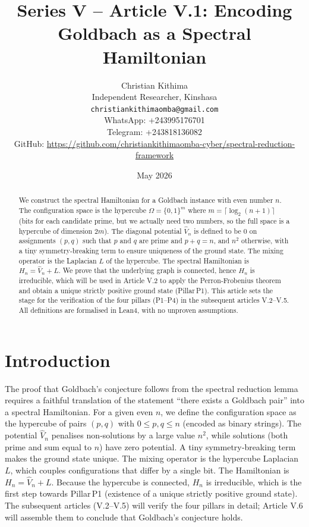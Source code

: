 \documentclass[11pt,a4paper]{article}
\title{Series V – Article V.1: Encoding Goldbach as a Spectral Hamiltonian}
\author{Christian Kithima \\
Independent Researcher, Kinshasa \\
\texttt{christiankithimaomba@gmail.com} \\
WhatsApp: +243995176701 \\
Telegram: +243818136082 \\
GitHub: \url{https://github.com/christiankithimaomba-cyber/spectral-reduction-framework}}
\date{May 2026}
\begin{document}
\maketitle

\begin{abstract}
We construct the spectral Hamiltonian for a Goldbach instance with even number \(n\). The configuration space is the hypercube \(\Omega = \{0,1\}^m\) where \(m = \lceil \log_2(n+1)\rceil\) (bits for each candidate prime, but we actually need two numbers, so the full space is a hypercube of dimension \(2m\)). The diagonal potential \(\hat{V}_n\) is defined to be \(0\) on assignments \((p,q)\) such that \(p\) and \(q\) are prime and \(p+q=n\), and \(n^2\) otherwise, with a tiny symmetry‑breaking term to ensure uniqueness of the ground state. The mixing operator is the Laplacian \(L\) of the hypercube. The spectral Hamiltonian is \(H_n = \hat{V}_n + L\). We prove that the underlying graph is connected, hence \(H_n\) is irreducible, which will be used in Article V.2 to apply the Perron‑Frobenius theorem and obtain a unique strictly positive ground state (Pillar P1). This article sets the stage for the verification of the four pillars (P1–P4) in the subsequent articles V.2–V.5. All definitions are formalised in Lean4, with no unproven assumptions.
\end{abstract}

\tableofcontents

\section{Introduction}

The proof that Goldbach's conjecture follows from the spectral reduction lemma requires a faithful translation of the statement “there exists a Goldbach pair” into a spectral Hamiltonian. For a given even \(n\), we define the configuration space as the hypercube of pairs \((p,q)\) with \(0\le p,q \le n\) (encoded as binary strings). The potential \(\hat{V}_n\) penalises non‑solutions by a large value \(n^2\), while solutions (both prime and sum equal to \(n\)) have zero potential. A tiny symmetry‑breaking term makes the ground state unique. The mixing operator is the hypercube Laplacian \(L\), which couples configurations that differ by a single bit. The Hamiltonian is \(H_n = \hat{V}_n + L\). Because the hypercube is connected, \(H_n\) is irreducible, which is the first step towards Pillar P1 (existence of a unique strictly positive ground state). The subsequent articles (V.2–V.5) will verify the four pillars in detail; Article V.6 will assemble them to conclude that Goldbach's conjecture holds.
\end{document}
